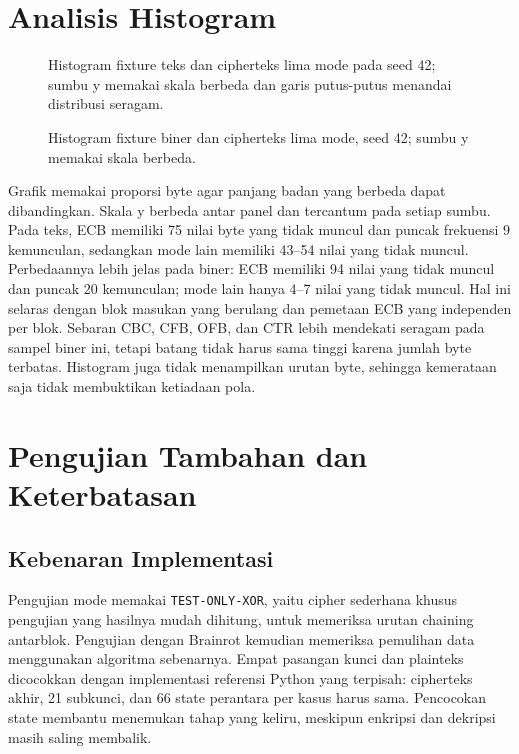 \section{Analisis Histogram}
\begin{figure}[htbp]
  \centering
  \caption{Histogram fixture teks dan cipherteks lima mode pada seed 42;
    sumbu y memakai skala berbeda dan garis putus-putus menandai distribusi seragam.}
  \label{fig:histogram}
\end{figure}
\begin{figure}[htbp]
  \centering
  \caption{Histogram fixture biner dan cipherteks lima mode, seed 42;
    sumbu y memakai skala berbeda.}
\end{figure}
Grafik memakai proporsi byte agar panjang badan yang berbeda dapat
dibandingkan. Skala y berbeda antar panel dan tercantum pada setiap sumbu.
Pada teks, ECB memiliki 75 nilai byte yang tidak muncul dan puncak
frekuensi 9 kemunculan, sedangkan mode lain memiliki 43--54 nilai yang
tidak muncul. Perbedaannya lebih jelas pada biner: ECB memiliki 94 nilai
yang tidak muncul dan puncak 20 kemunculan; mode lain hanya 4--7 nilai
yang tidak muncul. Hal ini selaras dengan blok masukan yang berulang dan
pemetaan ECB yang independen per blok. Sebaran CBC, CFB, OFB, dan CTR
lebih mendekati seragam pada sampel biner ini, tetapi batang tidak harus
sama tinggi karena jumlah byte terbatas. Histogram juga tidak menampilkan
urutan byte, sehingga kemerataan saja tidak membuktikan ketiadaan pola.

\clearpage
\section{Pengujian Tambahan dan Keterbatasan}
\subsection{Kebenaran Implementasi}
Pengujian mode memakai \texttt{TEST-ONLY-XOR}, yaitu cipher sederhana
khusus pengujian yang hasilnya mudah dihitung, untuk memeriksa urutan
chaining antarblok. Pengujian dengan Brainrot kemudian memeriksa
pemulihan data menggunakan algoritma sebenarnya. Empat pasangan kunci
dan plainteks dicocokkan dengan implementasi referensi Python yang
terpisah: cipherteks akhir, 21 subkunci, dan 66 state perantara per kasus
harus sama. Pencocokan state membantu menemukan tahap yang keliru,
meskipun enkripsi dan dekripsi masih saling membalik.

